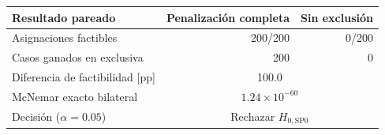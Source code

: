 \begin{tabular}{lrr}
\toprule
Resultado pareado & Penalización completa & Sin exclusión \\
\midrule
Asignaciones factibles & 200/200 & 0/200 \\
Casos ganados en exclusiva & 200 & 0 \\
Diferencia de factibilidad [pp] & \multicolumn{2}{c}{100.0} \\
McNemar exacto bilateral & \multicolumn{2}{c}{$1.24\times10^{-60}$} \\
Decisión ($\alpha=0.05$) & \multicolumn{2}{c}{Rechazar $H_{0,\mathrm{SP0}}$} \\
\bottomrule
\end{tabular}
